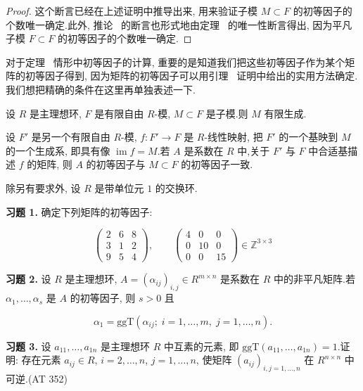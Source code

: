 \begin{proof}
这个断言已经在上述证明中推导出来, 用来验证子模 $M \subset F$ 的初等因子的个数唯一确定.此外, 推论~ 的断言也形式地由定理~ 的唯一性断言得出, 因为平凡子模 $F \subset F$ 的初等因子的个数唯一确定.
\end{proof}

对于定理~ 情形中初等因子的计算, 重要的是知道我们把这些初等因子作为某个矩阵的初等因子得到, 因为矩阵的初等因子可以用引理~ 证明中给出的实用方法确定.我们想把精确的条件在这里再单独表述一下.

\begin{corollary}\label{cor:6.3.8}
设 $R$ 是主理想环, $F$ 是有限自由 $R$-模, $M \subset F$ 是子模.则 $M$ 有限生成.

设 $F'$ 是另一个有限自由 $R$-模, $f \colon F' \longrightarrow F$ 是 $R$-线性映射, 把 $F'$ 的一个基映到 $M$ 的一个生成系, 即具有像 $\operatorname{im} f = M$.若 $A$ 是系数在 $R$ 中,关于 $F'$ 与 $F$ 中合适基描述 $f$ 的矩阵, 则 $A$ 的初等因子与 $M \subset F$ 的初等因子一致.
\end{corollary}

\aufgaben

除另有要求外, 设 $R$ 是带单位元 $1$ 的交换环.

\noindent\textbf{习题 1.} 确定下列矩阵的初等因子:

\[
\left(\begin{array}{ccc} 2 & 6 & 8 \\ 3 & 1 & 2 \\ 9 & 5 & 4 \end{array}\right), \qquad \left(\begin{array}{ccc} 4 & 0 & 0 \\ 0 & 10 & 0 \\ 0 & 0 & 15 \end{array}\right) \in \mathbb{Z}^{3 \times 3}\]

\medskip
\noindent\textbf{习题 2.} 设 $R$ 是主理想环, $A = (\alpha_{ij})_{i, j} \in R^{m \times n}$ 是系数在 $R$ 中的非平凡矩阵.若 $\alpha_1, \ldots, \alpha_s$ 是 $A$ 的初等因子, 则 $s > 0$ 且

\[
\alpha_1 = \mathrm{ggT}(\alpha_{ij};\; i = 1, \ldots, m, \; j = 1, \ldots, n)\text{.}\]

\medskip
\noindent\textbf{习题 3.} 设 $a_{11}, \ldots, a_{1n}$ 是主理想环 $R$ 中互素的元素, 即 $\mathrm{ggT}(a_{11}, \ldots, a_{1n}) = 1$.证明: 存在元素 $a_{ij} \in R$, $i = 2, \ldots, n$, $j = 1, \ldots, n$, 使矩阵 $(a_{ij})_{i, j = 1, \ldots, n}$ 在 $R^{n \times n}$ 中可逆.(AT 352)

